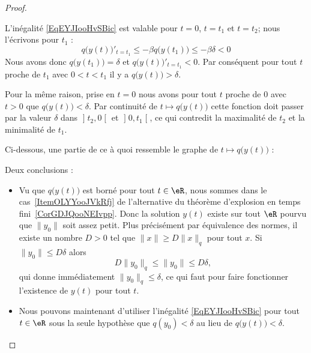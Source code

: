 \begin{proof}
\begin{subproof}

		L'inégalité \eqref{EqEYJIooHvSBic} est valable pour \( t=0\), \( t=t_1\) et \( t=t_2\); nous l'écrivons pour \( t_1\) :
		\begin{equation}
			q\big( y(t) \big)'_{t=t_1}\leq-\beta q\big( y(t_1) \big)\leq-\beta \delta<0
		\end{equation}
		Nous avons donc \( q\big( y(t_1) \big)=\delta\) et \( q\big( y(t) \big)'_{t=t_1}<0\). Par conséquent pour tout \( t\) proche de \( t_1\) avec \( 0<t<t_1 \) il y a \( q\big( y(t) \big)>\delta\).


		Pour la même raison, prise en \( t=0\) nous avons pour tout \( t\) proche de \( 0\) avec \( t>0\) que \( q\big( y(t) \big)<\delta\). Par continuité de \( t\mapsto q\big( y(t) \big)\) cette fonction doit passer par la valeur \( \delta\) dans \( \mathopen] t_2 , 0 \mathclose[\) et \( \mathopen] 0 , t_1 \mathclose[\), ce qui contredit la maximalité de \( t_2\) et la minimalité de \( t_1\).

		Ci-dessous, une partie de ce à quoi ressemble le graphe de \( t\mapsto q\big( y(t) \big)\) :
		\begin{center}
			
		\end{center}

		Deux conclusions :
		\begin{itemize}
			\item
			      Vu que \( q\big( y(t) \big)\) est borné pour tout \( t\in \eR\), nous sommes dans le cas~\ref{ItemOLYYooJVkRfj} de l'alternative du théorème d'explosion en temps fini~\ref{CorGDJQooNEIvpp}. Donc la solution \( y(t)\) existe sur tout \( \eR\) pourvu que \( \| y_0 \|\) soit assez petit. Plus précisément par équivalence des normes, il existe un nombre \( D>0\) tel que \( \| x \|\geq D\| x \|_q\) pour tout \( x\). Si \( \| y_0 \|\leq D\delta\) alors
			      \begin{equation}
				      D\| y_0 \|_q\leq \| y_0 \|\leq D\delta,
			      \end{equation}
			      qui donne immédiatement \( \| y_0 \|_q\leq \delta\), ce qui faut pour faire fonctionner l'existence de \( y(t)\) pour tout \( t\).
			\item
			      Nous pouvons maintenant d'utiliser l'inégalité \eqref{EqEYJIooHvSBic} pour tout \( t\in \eR\) sous la seule hypothèse que \( q(y_0)<\delta\) au lieu de \( q\big( y(t) \big)<\delta\).
		\end{itemize}


\end{subproof}
\end{proof}
